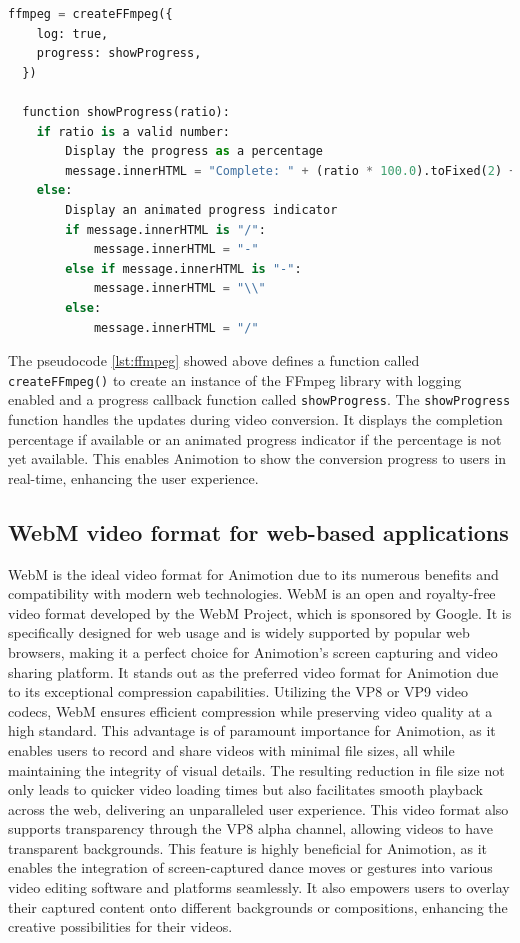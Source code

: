 \begin{lstlisting}[language=Python,caption=Showing the progress of conversion,label=lst:ffmpeg]
  ffmpeg = createFFmpeg({
    log: true,
    progress: showProgress,
  })

  function showProgress(ratio):
    if ratio is a valid number:
        Display the progress as a percentage
        message.innerHTML = "Complete: " + (ratio * 100.0).toFixed(2) + "%"
    else:
        Display an animated progress indicator
        if message.innerHTML is "/":
            message.innerHTML = "-"
        else if message.innerHTML is "-":
            message.innerHTML = "\\"
        else:
            message.innerHTML = "/"
\end{lstlisting}

The pseudocode \ref{lst:ffmpeg} showed above defines a function called \texttt{createFFmpeg()} 
to create an instance of the FFmpeg library with logging enabled and a progress callback function called \texttt{showProgress}.
The \texttt{showProgress} function handles the updates during video conversion. It displays the completion percentage if 
available or an animated progress indicator if the percentage is not yet available. This enables Animotion to show the 
conversion progress to users in real-time, enhancing the user experience.

\subsection{WebM video format for web-based applications}
WebM is the ideal video format for Animotion due to its numerous benefits and compatibility with modern web technologies. 
WebM is an open and royalty-free video format developed by the WebM Project, which is sponsored by Google. It is specifically 
designed for web usage and is widely supported by popular web browsers, making it a perfect choice for Animotion's screen 
capturing and video sharing platform. It stands out as the preferred video format 
for Animotion due to its exceptional compression capabilities. Utilizing the VP8 or VP9 video codecs, WebM ensures 
efficient compression while preserving video quality at a high standard. This advantage is of paramount importance for Animotion, 
as it enables users to record and share videos with minimal file sizes, all while maintaining the integrity of visual details. 
The resulting reduction in file size not only leads to quicker video loading times but also facilitates smooth 
playback across the web, delivering an unparalleled user experience.
This video format also supports transparency through the VP8 alpha channel, allowing videos to have 
transparent backgrounds. This feature is highly beneficial for Animotion, as it enables the integration 
of screen-captured dance moves or gestures into various video editing software and platforms seamlessly. 
It also empowers users to overlay their captured content onto different backgrounds or compositions, 
enhancing the creative possibilities for their videos. \cite{webm}

